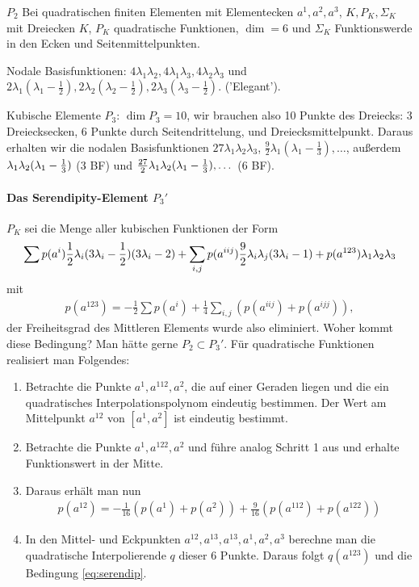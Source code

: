 $P_2$ Bei quadratischen finiten Elementen mit Elementecken $a^1, a^2, a^3$, $K, P_K, \Sigma_K$ mit Dreiecken $K$, $P_K$ quadratische Funktionen, $\dim = 6$ und $\Sigma_K$ Funktionswerde in den Ecken und Seitenmittelpunkten.

Nodale Basisfunktionen: $4 \lambda_1 \lambda_2, 4 \lambda_1 \lambda_3 , 4 \lambda_2 \lambda_3$ und $2\lambda_1(\lambda_1 - \frac{1}{2}), 2\lambda_2(\lambda_2 - \frac{1}{2}), 2\lambda_3(\lambda_3 - \frac{1}{2})$. ('Elegant').

Kubische Elemente $P_3$: $\dim P_3 = 10$, wir brauchen also 10 Punkte des Dreiecks: 3 Dreiecksecken, 6 Punkte durch Seitendrittelung, und Dreiecksmittelpunkt. 
Daraus erhalten wir die nodalen Basisfunktionen $27 \lambda_1 \lambda_2 \lambda_3$, $\frac 9 2 \lambda_1(\lambda_1 -\frac 1 3), \dots$, außerdem $ \lambda_1 \lambda_2( \lambda _1 - \frac 1 3)$ (3 BF) und $\frac {27} 2 \lambda_1 \lambda_2(\lambda_1  - \frac 1 3), \dots $ (6 BF).

\paragraph{Das Serendipity-Element $P_3'$}

$P_K$ sei die Menge aller kubischen Funktionen der Form
\begin{align*}
  \sum p(a^i) \frac 1 2 \lambda_i(3 \lambda_i - \frac 1 2)(3 \lambda_i -2) + \sum_{i,j} p(a^{iij})\frac 9 2 \lambda_i \lambda_j(3\lambda_i-1) + p(a^{123}) \lambda_1\lambda_2 \lambda_3
\end{align*}
mit
\begin{align}\label{eq:serendip}
  p(a^{123}) = - \frac 1 2\sum p(a^i) + \frac 1 4 \sum_{i, j} (p(a^{iij})+ p(a^{ijj})),
\end{align}
der Freiheitsgrad des Mittleren Elements wurde also eliminiert. Woher kommt diese Bedingung? Man hätte gerne $P_2 \subset P_3'$.
Für quadratische Funktionen realisiert man Folgendes: 
\begin{enumerate}
\item Betrachte die Punkte $a^1, a^{112}, a^2$, die auf einer Geraden liegen und die ein quadratisches Interpolationspolynom eindeutig bestimmen. Der Wert am  Mittelpunkt $a^{12}$ von $[a^1, a^2]$ ist eindeutig bestimmt.
\item Betrachte die Punkte $a^1, a^{122}, a^2$ und führe analog Schritt 1 aus und erhalte Funktionswert in der Mitte. 
\item Daraus erhält man nun 
  \begin{align*}
    p(a^{12}) = - \frac 1 {16} (p(a^1)+ p(a^2)) + \frac 9 {16} (p(a^{112})+ p(a^{122}))
  \end{align*}
\item In den Mittel- und Eckpunkten $a^{12}, a^{13}, a^{13}, a^1, a^2, a^3$ berechne man die quadratische Interpolierende $q$ dieser 6 Punkte. Daraus folgt $q(a^{123})$ und die Bedingung \eqref{eq:serendip}.
\end{enumerate}
